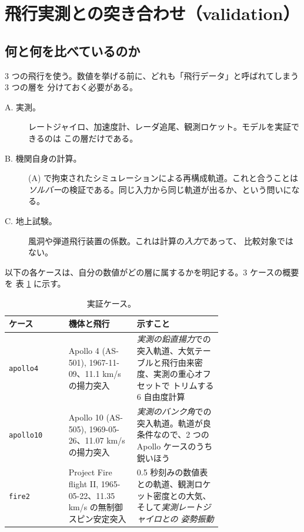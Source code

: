 \documentclass[11pt,a4paper,dvipdfmx]{jsarticle}
\begin{document}
\section{飛行実測との突き合わせ（validation）} \label{validation}

\subsection{何と何を比べているのか}

3 つの飛行を使う。数値を挙げる前に、どれも「飛行データ」と呼ばれてしまう 3 つの層を
分けておく必要がある。

\begin{description}
\item[A. 実測。] レートジャイロ、加速度計、レーダ追尾、観測ロケット。モデルを実証できるのは
この層だけである。
\item[B. 機関自身の計算。] (A) で拘束されたシミュレーションによる再構成軌道。これと合うことは
\emph{ソルバー}の検証である。同じ入力から同じ軌道が出るか、という問いになる。
\item[C. 地上試験。] 風洞や弾道飛行装置の係数。これは計算の\emph{入力}であって、
比較対象ではない。
\end{description}

以下の各ケースは、自分の数値がどの層に属するかを明記する。3 ケースの概要を
表 \ref{validation_cases} に示す。

\begin{table}[h]
\caption{実証ケース。}
\label{validation_cases}
\begin{center}
\begin{tabular}{l|p{0.32\linewidth}|p{0.40\linewidth}}
\hline \hline
ケース & 機体と飛行 & 示すこと \\
\hline
\texttt{apollo4} & Apollo 4 (AS-501), 1967-11-09、11.1 km/s の揚力突入 &
\emph{実測の鉛直揚力}での突入軌道、大気テーブルと飛行由来密度、実測の重心オフセットで
トリムする 6 自由度計算 \\
\texttt{apollo10} & Apollo 10 (AS-505), 1969-05-26、11.07 km/s の揚力突入 &
\emph{実測のバンク角}での突入軌道。軌道が良条件なので、2 つの Apollo ケースのうち鋭いほう \\
\texttt{fire2} & Project Fire flight II, 1965-05-22、11.35 km/s の無制御スピン安定突入 &
0.5 秒刻みの数値表との軌道、観測ロケット密度との大気、そして\emph{実測レートジャイロとの
姿勢振動} \\
\hline \hline
\end{tabular}
\end{center}
\end{table}
\end{document}
